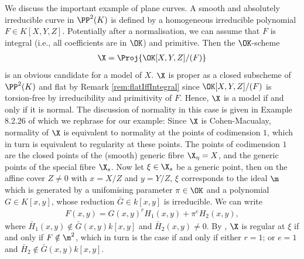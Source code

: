 \begin{example}\label{ex:model-of-plane-curve}
    We discuss the important example of plane curves. 
    A smooth and absolutely irreducible curve in $\PP^2(K)$ is defined by a homogeneous irreducible polynomial $F \in K [X,Y,Z]$.
    Potentially after a normalisation, we can assume that $F$ is integral (i.e., all coefficients are in $\OK$) and primitive.
    Then the $\OK$-scheme 
    \begin{align}
        \X = \Proj{\OK[X,Y,Z]/(F)}
    \end{align}
    is an obvious candidate for a model of $X$.
    $\X$ is proper as a closed subscheme of $\PP^2(K)$ and flat by Remark \ref{rem:flatIffIntegral} since 
    $\OK[X,Y,Z]/(F)$ is torsion-free by irreducibility and primitivity of $F$.
    Hence, $\X$ is a model if and only if it is normal.
    The discussion of normality in this case is given in Example 8.2.26 of \cite{Liu} which we rephrase for our example:
    Since $\X$ is Cohen-Macualay, normality of $\X$ is equivalent to normality at the points of codimension $1$,
    which in turn is equivalent to regularity at these points.
    The points of codimension $1$ are the closed points of the (smooth) generic fibre $\X_\eta = X$,
    and the generic points of the special fibre $\X_s$.
    Now let $\xi \in \X_s$ be a generic point, then on the affine cover $Z \neq 0$
    with $x = X/Z$ and $y = Y/Z$, $\xi$ corresponds to the ideal $\m$ which is generated by a unifomising parameter $\pi \in \OK$
    and a polynomial $G \in K[x,y]$, whose reduction $\bar{G} \in k[x,y]$ is irreducible.
    We can write 
    \begin{align}
        F(x,y) = G(x,y)^r H_1(x,y) + \pi^e H_2(x,y),
    \end{align}
    where $\bar{H}_1(x,y) \notin \bar{G}(x,y)k[x,y]$ and $\bar{H}_2(x,y)\neq 0$.
    By \cite[Corollary 4.2.12]{Liu}, $\X$ is regular at $\xi$ if and only if $F \notin \m^2$,
    which in turn is the case if and only if either $r=1$; or $e=1$ and $\bar{H}_2 \notin \bar{G}(x,y)k[x,y]$.
    
\end{example}

